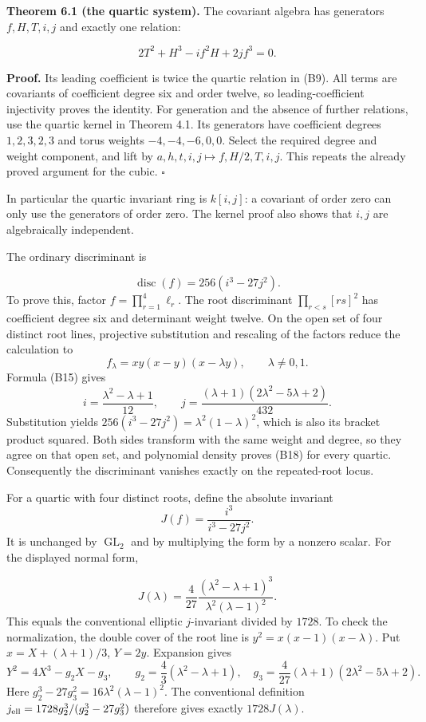 \documentclass[
]{article}
\begin{document}
\protect{}\label{theorem-6-1}{}

\textbf{Theorem 6.1 (the quartic system).} The covariant algebra has
generators \(f,H,T,i,j\) and exactly one relation:
\protect{}\label{equation-B17}{}

\[
2T^2+H^3-if^2H+2jf^3=0.
\tag{B17}
\]

\textbf{Proof.} Its leading coefficient is twice the quartic relation in
(B9). All terms are covariants of coefficient degree six and order
twelve, so leading-coefficient injectivity proves the identity. For
generation and the absence of further relations, use the quartic kernel
in Theorem 4.1. Its generators have coefficient degrees \(1,2,3,2,3\)
and torus weights \(-4,-4,-6,0,0\). Select the required degree and
weight component, and lift by \(a,h,t,i,j\mapsto f,H/2,T,i,j\). This
repeats the already proved argument for the cubic. \(\square\)

In particular the quartic invariant ring is \(k [i,j]\): a covariant of
order zero can only use the generators of order zero. The kernel proof
also shows that \(i,j\) are algebraically independent.

The ordinary discriminant is
\protect{}\label{equation-B18}{}

\[
\operatorname{disc}(f)=256(i^3-27j^2).
\tag{B18}
\] To prove this, factor \(f=\prod_{r=1}^4\ell_r\). The root
discriminant \(\prod_{r<s}[rs]^2\) has coefficient degree six and
determinant weight twelve. On the open set of four distinct root lines,
projective substitution and rescaling of the factors reduce the
calculation to \[
f_\lambda=xy(x-y)(x-\lambda y),\qquad \lambda\ne0,1.
\] Formula (B15) gives \[
i=\frac{\lambda^2-\lambda+1}{12},\qquad
j=\frac{(\lambda+1)(2\lambda^2-5\lambda+2)}{432}.
\] Substitution yields \(256(i^3-27j^2)=\lambda^2(1-\lambda)^2\), which
is also its bracket product squared. Both sides transform with the same
weight and degree, so they agree on that open set, and polynomial
density proves (B18) for every quartic. Consequently the discriminant
vanishes exactly on the repeated-root locus.

For a quartic with four distinct roots, define the absolute invariant \[
J(f)=\frac{i^3}{i^3-27j^2}.
\] It is unchanged by \(\operatorname{GL}_2\) and by multiplying the
form by a nonzero scalar. For the displayed normal form,
\protect{}\label{equation-B19}{}

\[
J(\lambda)=\frac4{27}
\frac{(\lambda^2-\lambda+1)^3}{\lambda^2(\lambda-1)^2}.
\tag{B19}
\] This equals the conventional elliptic \(j\)-invariant divided by
\(1728\). To check the normalization, the double cover of the root line
is \(y^2=x(x-1)(x-\lambda)\). Put \(x=X+(\lambda+1)/3\), \(Y=2y\).
Expansion gives \[
Y^2=4X^3-g_2X-g_3,\qquad
g_2=\frac43(\lambda^2-\lambda+1),\quad
g_3=\frac4{27}(\lambda+1)(2\lambda^2-5\lambda+2).
\] Here \(g_2^3-27g_3^2=16\lambda^2(\lambda-1)^2\). The conventional
definition \(j_{\rm ell}=1728g_2^3/(g_2^3-27g_3^2)\) therefore gives
exactly \(1728J(\lambda)\).
\end{document}
